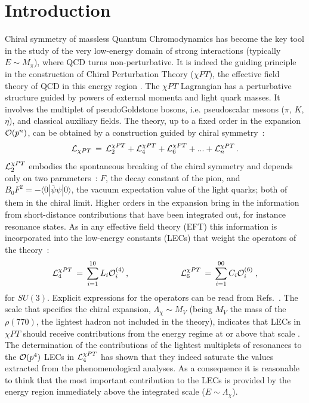 \documentclass{appolb}
\begin{document}
\section{Introduction}
Chiral symmetry of massless Quantum Chromodynamics has become the key tool in the study of the very low-energy domain
of strong interactions (typically $E \sim M_{\pi}$), where QCD turns non-perturbative. It is indeed the guiding principle
in the construction of Chiral Perturbation Theory ($\chi PT$), the effective field theory of QCD in this energy region
\cite{Weinberg:1978kz,Gasser:1983yg,Gasser:1984gg}. The $\chi PT$ Lagrangian has a perturbative structure guided
 by powers of external
momenta and light quark masses. It involves the multiplet of pseudoGoldstone bosons, i.e. pseudoscalar mesons ($\pi$,
$K$, $\eta$), and classical auxiliary fields. The theory, up to a fixed order in the expansion ${\cal O}(p^n)$, can be
obtained by a construction guided by chiral symmetry~:
\begin{equation}
{\cal L}_{\chi PT} \, = \, {\cal L}_2^{\chi PT} + {\cal L}_4^{\chi PT} + {\cal L}_6^{\chi PT} + ... + 
{\cal L}_n^{\chi PT} \, .
\end{equation}
${\cal L}_2^{\chi PT}$ embodies the spontaneous breaking of the chiral symmetry and depends only on two parameters~: $F$,
the decay constant of the pion, and $B_0 F^2 = - \langle 0 | \overline{\psi} \psi |0 \rangle$, the vacuum expectation
value of the light quarks; both of them in the chiral limit. Higher orders in the expansion bring in the information
from short-distance contributions that have been integrated out, for instance resonance states. As in any effective field
theory (EFT) this information is incorporated into the low-energy constants (LECs) that weight the operators of the theory~:
\begin{eqnarray} \label{eq:chpt}
{\cal L}_4^{\chi PT} \, = \, \sum_{i=1}^{10} L_i {\cal O}_i^{(4)} \, , & \; \; \; \; \; \; \; \; \; \; \; \; 
\; \; \;  \; \; \; & \; 
{\cal L}_6^{\chi PT} \, = \, \sum_{i=1}^{90} C_i {\cal O}_i^{(6)} \; , 
\end{eqnarray}
for $SU(3)$. Explicit expressions for the operators can be read from Refs.~\cite{Gasser:1984gg,Bijnens:1999sh}. The scale
that specifies the chiral expansion, $\Lambda_{\chi} \sim M_V$ (being $M_V$ the mass of the $\rho(770)$, the lightest
hadron not included in the theory), indicates that LECs in $\chi PT$ should receive
contributions from the energy regime at or above that scale \cite{Georgi:1991ch}. The determination of the contributions
of the lightest multiplets of resonances to the ${\cal O}(p^4)$ LECs in ${\cal L}_4^{\chi PT}$ \cite{Ecker:1988te} has
shown that they indeed saturate the values extracted from the phenomenological analyses. As a consequence it is reasonable to
think that the most important contribution to the LECs is provided by the energy region immediately above the integrated
scale ($E \sim \Lambda_{\chi}$).
\end{document}
